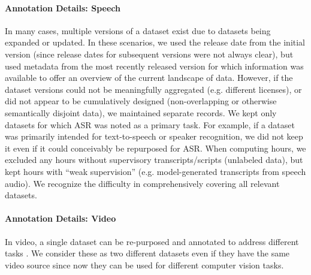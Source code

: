 \paragraph{Annotation Details: Speech}
In many cases, multiple versions of a dataset exist due to datasets being expanded or updated. In these scenarios, we used the release date from the initial version (since release dates for subsequent versions were not always clear), but used metadata from the most recently released version for which information was available to offer an overview of the current landscape of data. However, if the dataset versions could not be meaningfully aggregated (e.g. different licenses), or did not appear to be cumulatively designed (non-overlapping or otherwise semantically disjoint data), we maintained separate records. We kept only datasets for which ASR was noted as a primary task. For example, if a dataset was primarily intended for text-to-speech or speaker recognition, we did not keep it even if it could conceivably be repurposed for ASR. When computing hours, we excluded any hours without supervisory transcripts/scripts (unlabeled data), but kept hours with ``weak supervision'' (e.g. model-generated transcripts from speech audio). 
We recognize the difficulty in comprehensively covering all relevant datasets. 

\paragraph{Annotation Details: Video} In video, a single dataset can be re-purposed and annotated to address different tasks \cite{monfort2019moments, monfortSpokenMomentsLearning2021}. We consider these as two different datasets even if they have the same video source since now they can be used for different computer vision tasks. 

\clearpage



